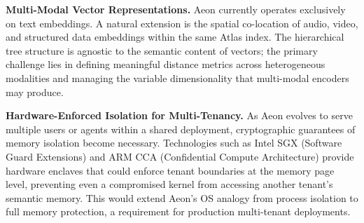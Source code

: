 \documentclass[10pt,twocolumn]{article}
\begin{document}
\textbf{Multi-Modal Vector Representations.} Aeon currently operates exclusively on text embeddings. A natural extension is the spatial co-location of audio, video, and structured data embeddings within the same Atlas index. The hierarchical tree structure is agnostic to the semantic content of vectors; the primary challenge lies in defining meaningful distance metrics across heterogeneous modalities and managing the variable dimensionality that multi-modal encoders may produce.

\textbf{Hardware-Enforced Isolation for Multi-Tenancy.} As Aeon evolves to serve multiple users or agents within a shared deployment, cryptographic guarantees of memory isolation become necessary. Technologies such as Intel SGX (Software Guard Extensions) and ARM CCA (Confidential Compute Architecture) provide hardware enclaves that could enforce tenant boundaries at the memory page level, preventing even a compromised kernel from accessing another tenant's semantic memory. This would extend Aeon's OS analogy from process isolation to full memory protection, a requirement for production multi-tenant deployments.



\end{document}
